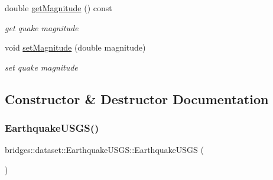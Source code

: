 \begin{DoxyCompactItemize}
double \hyperlink{classbridges_1_1dataset_1_1_earthquake_u_s_g_s_aeb1be6b0dece1240da3123db9f9c2d9b}{get\+Magnitude} () const
\begin{DoxyCompactList}\small\item\em get quake magnitude \end{DoxyCompactList}\item 
void \hyperlink{classbridges_1_1dataset_1_1_earthquake_u_s_g_s_ab961fcafd63f3ec0626ff38e2c4c01cd}{set\+Magnitude} (double magnitude)
\begin{DoxyCompactList}\small\item\em set quake magnitude \end{DoxyCompactList}\end{DoxyCompactItemize}


\subsection{Constructor \& Destructor Documentation}
\mbox{\label{classbridges_1_1dataset_1_1_earthquake_u_s_g_s_a2e89f6ef9b631c6b8315c696cee7fb53}} 
\subsubsection{\texorpdfstring{Earthquake\+U\+S\+G\+S()}{EarthquakeUSGS()}\hspace{0.1cm}{\footnotesize\ttfamily [1/3]}}
{\footnotesize\ttfamily bridges\+::dataset\+::\+Earthquake\+U\+S\+G\+S\+::\+Earthquake\+U\+S\+GS (\begin{DoxyParamCaption}{ }\end{DoxyParamCaption})\hspace{0.3cm}{\ttfamily [inline]}}

\mbox{\label{classbridges_1_1dataset_1_1_earthquake_u_s_g_s_a3bb03ca9f4c0a3c8ecbab5a90b1886f8}} 
